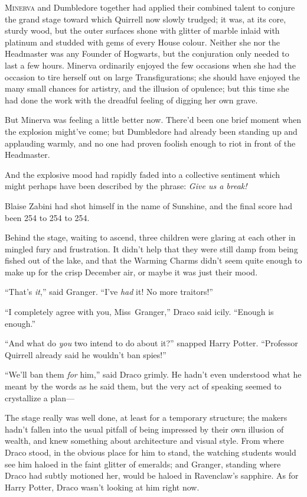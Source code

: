 
\lettrine{M}{inerva} and Dumbledore together had applied their combined talent to conjure the grand stage toward which Quirrell now slowly trudged; it was, at its core, sturdy wood, but the outer surfaces shone with glitter of marble inlaid with platinum and studded with gems of every House colour. Neither she nor the Headmaster was any Founder of Hogwarts, but the conjuration only needed to last a few hours. Minerva ordinarily enjoyed the few occasions when she had the occasion to tire herself out on large Transfigurations; she should have enjoyed the many small chances for artistry, and the illusion of opulence; but this time she had done the work with the dreadful feeling of digging her own grave.

But Minerva was feeling a little better now. There’d been one brief moment when the explosion might’ve come; but Dumbledore had already been standing up and applauding warmly, and no one had proven foolish enough to riot in front of the Headmaster.

And the explosive mood had rapidly faded into a collective sentiment which might perhaps have been described by the phrase: \emph{Give us a break!}

Blaise Zabini had shot himself in the name of Sunshine, and the final score had been 254 to 254 to 254.

\later

Behind the stage, waiting to ascend, three children were glaring at each other in mingled fury and frustration. It didn’t help that they were still damp from being fished out of the lake, and that the Warming Charms didn’t seem quite enough to make up for the crisp December air, or maybe it was just their mood.

“That’s \emph{it},” said Granger. “I’ve \emph{had} it! No more traitors!”

“I completely agree with you, Miss~Granger,” Draco said icily. “Enough is enough.”

“And what do \emph{you} two intend to do about it?” snapped Harry Potter. “Professor Quirrell already said he wouldn’t ban spies!”

“We’ll ban them \emph{for} him,” said Draco grimly. He hadn’t even understood what he meant by the words as he said them, but the very act of speaking seemed to crystallize a plan—

\later

The stage really was well done, at least for a temporary structure; the makers hadn’t fallen into the usual pitfall of being impressed by their own illusion of wealth, and knew something about architecture and visual style. From where Draco stood, in the obvious place for him to stand, the watching students would see him haloed in the faint glitter of emeralds; and Granger, standing where Draco had subtly motioned her, would be haloed in Ravenclaw’s sapphire. As for Harry Potter, Draco wasn’t looking at him right now.

